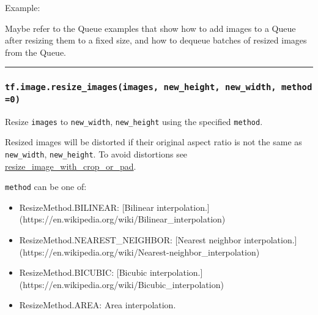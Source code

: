 Example:

\begin{Shaded}
\begin{Highlighting}[]
\OperatorTok{=} 
\OperatorTok{=} \NormalTok{tf.image.resize_bilinear(image, [}\NormalTok{, }\NormalTok{])}
\end{Highlighting}
\end{Shaded}

Maybe refer to the Queue examples that show how to add images to a Queue
after resizing them to a fixed size, and how to dequeue batches of
resized images from the Queue.

\begin{center}\rule{0.5\linewidth}{\linethickness}\end{center}

\subsubsection{\texorpdfstring{\texttt{tf.image.resize\_images(images,\ new\_height,\ new\_width,\ method=0)}
}{tf.image.resize\_images(images, new\_height, new\_width, method=0) }}\label{tf.image.resizeux5fimagesimages-newux5fheight-newux5fwidth-method0}

Resize \texttt{images} to \texttt{new\_width}, \texttt{new\_height}
using the specified \texttt{method}.

Resized images will be distorted if their original aspect ratio is not
the same as \texttt{new\_width}, \texttt{new\_height}. To avoid
distortions see
\protect\hyperlink{resizeux5fimageux5fwithux5fcropux5forux5fpad}{resize\_image\_with\_crop\_or\_pad}.

\texttt{method} can be one of:

\begin{itemize}
\tightlist
\item
  ResizeMethod.BILINEAR: {[}Bilinear interpolation.{]}
  (https://en.wikipedia.org/wiki/Bilinear\_interpolation)
\item
  ResizeMethod.NEAREST\_NEIGHBOR: {[}Nearest neighbor interpolation.{]}
  (https://en.wikipedia.org/wiki/Nearest-neighbor\_interpolation)
\item
  ResizeMethod.BICUBIC: {[}Bicubic interpolation.{]}
  (https://en.wikipedia.org/wiki/Bicubic\_interpolation)
\item
  ResizeMethod.AREA: Area interpolation.
\end{itemize}

